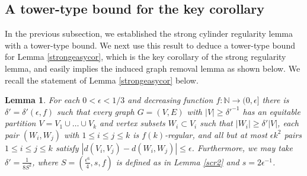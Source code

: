 \documentclass[11pt]{article}
\newtheorem{lemma}{Lemma}[section]
\begin{document}
\subsection{A tower-type bound for the key corollary} \label{inducedsub4}

In the previous subsection, we established the strong cylinder regularity lemma
with a tower-type bound. We next use this result to deduce a tower-type bound
for Lemma \ref{strongeasycor}, which is the key corollary of the strong
regularity lemma, and easily implies the induced graph removal lemma as shown
below. We recall the statement of Lemma \ref{strongeasycor} below.

\begin{lemma} \label{easycor2}
For each $0 < \epsilon < 1/3$ and decreasing function $f:\mathbb{N}\rightarrow
(0,\epsilon]$ there is $\delta'=\delta'(\epsilon,f)$ such that every graph $G=(V,E)$ with $|V| \geq \delta'^{-1}$ 
has an equitable partition $V=V_1 \cup \ldots \cup V_k$ and vertex subsets $W_i
\subset V_i$ such that $|W_i| \geq \delta' |V|$, each pair $(W_i,W_j)$ with
$1 \leq i \leq j \leq k$ is $f(k)$-regular, and all but at most $\epsilon k^2$
pairs $1 \leq i \leq j \leq k$ satisfy $|d(V_i,V_j)-d(W_i,W_j)| \leq \epsilon$.  Furthermore, we may take $\delta'=\frac{1}{8S^2}$, where $S=(\frac{\epsilon^6}{4},s,f)$ is defined as in Lemma \ref{scr2} and $s=2\epsilon^{-1}$.
\end{lemma}
\end{document}
